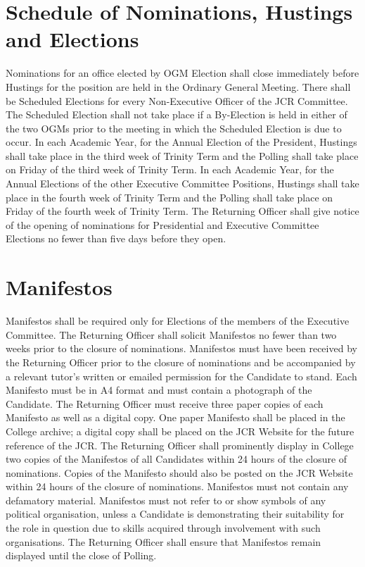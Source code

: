 \section{Schedule of Nominations, Hustings and Elections}
\npara Nominations for an office elected by OGM Election shall close immediately before Hustings for the position are held in the Ordinary General Meeting.
\npara There shall be Scheduled Elections for every Non-Executive Officer of the JCR Committee. 
\npara The Scheduled Election shall not take place if a By-Election is held in either of the two OGMs prior to the meeting in which the Scheduled Election is due to occur.
\npara In each Academic Year, for the Annual Election of the President, Hustings shall take place in the third week of Trinity Term and the Polling shall take place on Friday of the third week of Trinity Term.
\npara In each Academic Year,  for the Annual Elections of the other Executive Committee Positions, Hustings shall take place in the fourth week of Trinity Term and the Polling shall take place on Friday of the fourth week of Trinity Term. 
\npara The Returning Officer shall give notice of the opening of nominations for Presidential and Executive Committee Elections no fewer than five days before they open.
\section{Manifestos}
\npara Manifestos shall be required only for Elections of the members of the Executive Committee.
\npara The Returning Officer shall solicit Manifestos no fewer than two weeks prior to the closure of nominations.
\npara Manifestos must have been received by the Returning Officer prior to the closure of nominations and be accompanied by a relevant tutor's written or emailed permission for the Candidate to stand.
\npara Each Manifesto must be in A4 format and must contain a photograph of the Candidate. The Returning Officer must receive three paper copies of each Manifesto as well as a digital copy.
\npara One paper Manifesto shall be placed in the College archive; a digital copy shall be placed on the JCR Website for the future reference of the JCR.
\npara The Returning Officer shall prominently display in College two copies of the Manifestos of all Candidates within 24 hours of the closure of nominations. Copies of the Manifesto should also be posted on the JCR Website within 24 hours of the closure of nominations.
\npara Manifestos must not contain any defamatory material.
\npara Manifestos must not refer to or show symbols of any political organisation, unless a Candidate is demonstrating their suitability for the role in question due to skills acquired through involvement with such organisations.
\npara The Returning Officer shall ensure that Manifestos remain displayed until the close of Polling.

